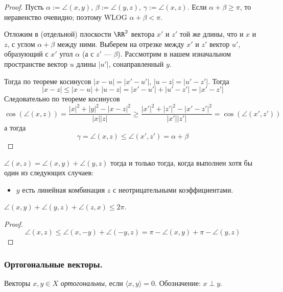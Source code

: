\documentclass[12pt,a4paper]{article}
\begin{document}
    \begin{proof}
        Пусть $\alpha := \angle(x, y)$, $\beta := \angle(y, z)$, $\gamma := \angle(x, z)$. Если $\alpha + \beta \geqslant \pi$, то неравенство очевидно; поэтому WLOG $\alpha + \beta < \pi$.

        Отложим в (отдельной) плоскости $\RR^2$ вектора $x'$ и $z'$ той же длины, что и $x$ и $z$, с углом $\alpha + \beta$ между ними. Выберем на отрезке между $x'$ и $z'$ вектор $u'$, образующий с $x'$ угол $\alpha$ (а с $z'$ --- $\beta$). Рассмотрим в нашем изначальном пространстве вектор $u$ длины $|u'|$, сонаправленный $y$.

        Тогда по теореме косинусов $|x - u| = |x' - u'|$, $|u - z| = |u' - z'|$. Тогда
        \[|x - z| \leqslant |x - u| + |u - z| = |x' - u'| + |u' - z'| = |x' - z'|\]
        Следовательно по теореме косинусов
        \[\cos(\angle(x, z)) = \frac{|x|^2 + |y|^2 - |x-z|^2}{|x||z|} \geqslant \frac{|x'|^2 + |z'|^2 - |x'-z'|^2}{|x'||z'|} = \cos(\angle(x', z'))\]
        а тогда
        \[\gamma = \angle(x, z) \leqslant \angle(x', z') = \alpha + \beta\]
    \end{proof}

    \begin{corollary}
        $\angle(x, z) = \angle(x, y) + \angle(y, z)$ тогда и только тогда, когда выполнен хотя бы один из следующих случаев:
        \begin{itemize}
            \item $y$ есть линейная комбинация $z$ с неотрицательными коэффициентами.
        \end{itemize}
    \end{corollary}

    \begin{corollary}
        $\angle(x, y) + \angle(y, z) + \angle(z, x) \leqslant 2 \pi$.
    \end{corollary}

    \begin{proof}
        \[\angle(x, z) \leqslant \angle(x, -y) + \angle(-y, z) = \pi - \angle(x, y) + \pi - \angle(y, z)\]
    \end{proof}

    \subsubsection{Ортогональные векторы.}

    \begin{definition}
        Векторы $x, y \in X$ \emph{ортогональны}, если $\langle x, y \rangle = 0$. Обозначение: $x \perp y$.
    \end{definition}
\end{document}
